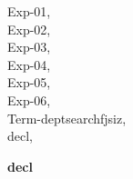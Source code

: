 \documentclass[a4paper]{article}
\begin{document}
\raggedright
              


{\parindent0cm

\begin{multicols}{3}
Exp-01, \pageref{lemma-Exp-01}\\
Exp-02, \pageref{lemma-Exp-02}\\
Exp-03, \pageref{lemma-Exp-03}\\
Exp-04, \pageref{lemma-Exp-04}\\
Exp-05, \pageref{lemma-Exp-05}\\
Exp-06, \pageref{lemma-Exp-06}\\
Term-deptsearchfjsiz, \pageref{lemma-Term-deptsearchfjsiz}\\
decl, \pageref{lemma-decl}\\

\end{multicols}}

\pagebreak

{\LARGE\bf decl}\label{lemma-decl}

\medskip
\end{document}
